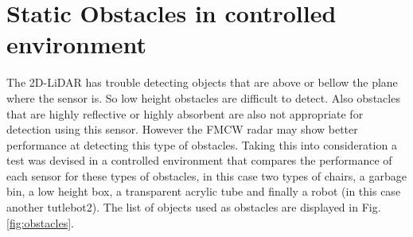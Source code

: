 \section {Static Obstacles in controlled environment}
The 2D-\ac{LiDAR} has trouble detecting objects that are above or bellow the plane where the sensor is. So low height obstacles  are difficult to detect. Also obstacles that are highly reflective or highly absorbent are also not appropriate for detection  using this sensor. However the \ac{FMCW} \ac{radar} may show better performance at detecting this type of obstacles.
Taking this into consideration a test was devised in a controlled environment that compares the performance of each sensor for these types of obstacles, in this case two types of chairs, a garbage bin, a low height box, a transparent acrylic tube and finally a robot (in this case another tutlebot2). 
The list of objects used as obstacles are displayed in Fig. \ref{fig:obstacles}.
